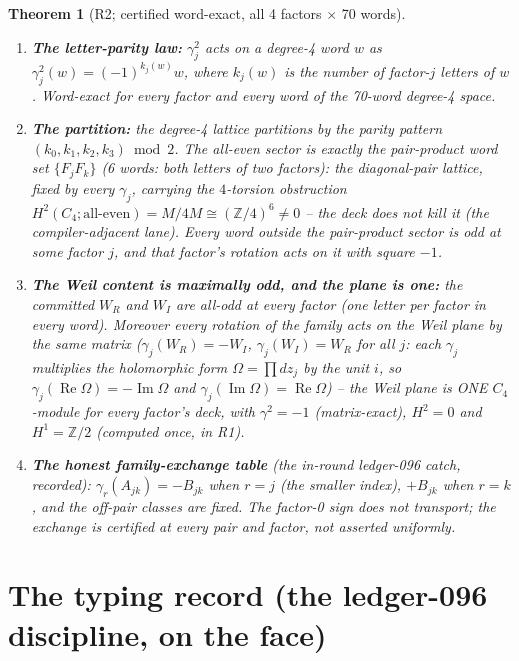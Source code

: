 \documentclass[11pt]{article}
\newtheorem{theorem}{Theorem}
\newcommand{\Z}{\mathbb Z}
\begin{document}
\begin{theorem}[R2; certified word-exact, all 4 factors $\times$ 70 words]
\begin{enumerate}
\item \textbf{The letter-parity law:} $\gamma_j^2$ acts on a degree-4
word $w$ as $\gamma_j^2(w)=(-1)^{k_j(w)}w$, where $k_j(w)$ is the number
of factor-$j$ letters of $w$. Word-exact for every factor and every
word of the 70-word degree-4 space.
\item \textbf{The partition:} the degree-4 lattice partitions by the
parity pattern $(k_0,k_1,k_2,k_3)\bmod 2$. The all-even sector is
\emph{exactly} the pair-product word set $\{F_jF_k\}$ (6 words:
both letters of two factors): the diagonal-pair lattice, fixed by every
$\gamma_j$, carrying the $4$-torsion obstruction $H^2(C_4;\text{all-even})
=M/4M\cong(\Z/4)^6\ne0$ -- the deck does \emph{not} kill it (the
compiler-adjacent lane). Every word outside the pair-product sector is
odd at some factor $j$, and that factor's rotation acts on it with
square $-1$.
\item \textbf{The Weil content is maximally odd, and the plane is one:}
the committed $W_R$ and $W_I$ are all-odd at \emph{every} factor (one
letter per factor in every word). Moreover every rotation of the family
acts on the Weil plane by the \emph{same} matrix
($\gamma_j(W_R)=-W_I$, $\gamma_j(W_I)=W_R$ for all $j$: each
$\gamma_j$ multiplies the holomorphic form $\Omega=\prod dz_j$ by the
unit $i$, so $\gamma_j(\operatorname{Re}\Omega)=-\operatorname{Im}
\Omega$ and $\gamma_j(\operatorname{Im}\Omega)=\operatorname{Re}
\Omega$) -- the Weil plane is ONE $C_4$-module for every factor's deck,
with $\gamma^2=-1$ (matrix-exact), $H^2=0$ and $H^1=\Z/2$ (computed
once, in R1).
\item \textbf{The honest family-exchange table} (the in-round ledger-096
catch, recorded): $\gamma_r(A_{jk})=-B_{jk}$ when $r=j$ (the smaller
index), $+B_{jk}$ when $r=k$, and the off-pair classes are fixed. The
factor-0 sign does \emph{not} transport; the exchange is certified at
every pair and factor, not asserted uniformly.
\end{enumerate}
\end{theorem}

\section{The typing record (the ledger-096 discipline, on the face)}
\end{document}
